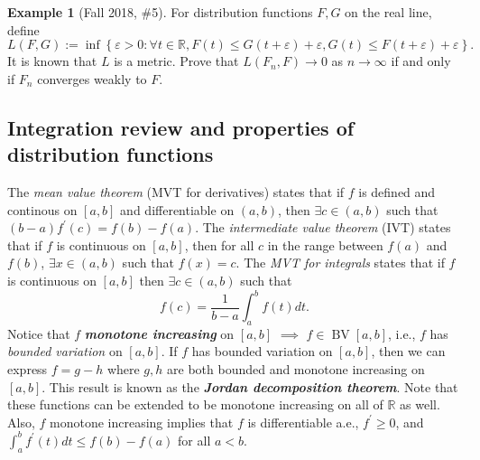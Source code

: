 \documentclass[12pt,reqno]{article}
\renewcommand{\emph}[1]{\textit{#1}}
\theoremstyle{plain}
\theoremstyle{definition}
\newtheorem{example}[theorem]{Example}
\begin{document}
\begin{example}[Fall 2018, \#5]
For distribution functions $F,G$ on the real line, define 
\[
L(F, G) := \inf\left\{\varepsilon>0: \forall t \in \mathbb{R}, 
     F(t) \leq G(t+\varepsilon) + \varepsilon, 
     G(t) \leq F(t+\varepsilon) + \varepsilon\right\}. 
\]
It is known that $L$ is a metric. Prove that $L(F_n, F) \rightarrow 0$ as 
$n \rightarrow \infty$ if and only if $F_n$ converges weakly to $F$. 
\end{example} 

\subsection{Integration review and properties of distribution functions} 

The \emph{mean value theorem} (MVT for derivatives) 
states that if $f$ is defined and continous on $[a,b]$ and 
differentiable on $(a,b)$, then $\exists c \in (a,b)$ such that 
$(b-a) f^{\prime}(c) = f(b) - f(a)$. The 
\emph{intermediate value theorem} (IVT) states that if $f$ is continuous on $[a,b]$, then for 
all $c$ in the range between $f(a)$ and $f(b)$, $\exists x \in (a, b)$ such that $f(x) = c$. 
The \emph{MVT for integrals} states that if $f$ is continuous on $[a,b]$ then $\exists c \in (a,b)$ 
such that $$f(c) = \frac{1}{b-a} \int_a^b f(t) dt.$$ 
Notice that $f$ \textbf{\emph{monotone increasing}} on 
$[a,b]$ $\implies$ $f \in \operatorname{BV}[a,b]$, i.e., $f$ has \emph{bounded variation} on $[a,b]$. 
If $f$ has bounded variation on $[a,b]$, then we can express $f = g-h$ where $g,h$ are both 
bounded and monotone increasing on $[a,b]$. This result is known as the 
\textbf{\emph{Jordan decomposition theorem}}. 
Note that these functions can be extended to 
be monotone increasing on all of $\mathbb{R}$ as well. 
Also, $f$ monotone increasing implies that $f$ is differentiable a.e., $f^{\prime} \geq 0$, and 
$\int_a^b f^{\prime}(t) dt \leq f(b)-f(a)$ for all $a < b$. 
\end{document}
